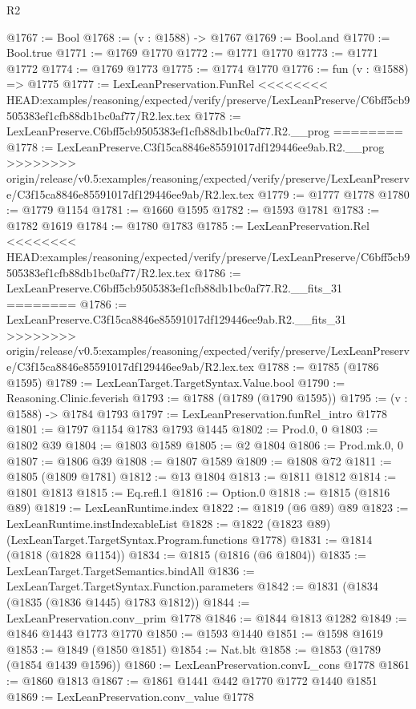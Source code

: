 \begin{lexlean}{R2}
\begin{coremodule}
{{{{{{{{{{{{{{{{{{{{{{{{{{{{{{{{{{{{{{{{{{{{{{{{{{{{{{{{{{{{{{{{{{{{{{{{{{{{{{{{{{{{{{{{{{{{@1767 := Bool
@1768 := (v : @1588) -> @1767
@1769 := Bool.and
@1770 := Bool.true
@1771 := @1769 @1770
@1772 := @1771 @1770
@1773 := @1771 @1772
@1774 := @1769 @1773
@1775 := @1774 @1770
@1776 := fun (v : @1588) => @1775
@1777 := LexLeanPreservation.FunRel
<<<<<<<< HEAD:examples/reasoning/expected/verify/preserve/LexLeanPreserve/C6bff5cb9505383ef1cfb88db1bc0af77/R2.lex.tex
@1778 := LexLeanPreserve.C6bff5cb9505383ef1cfb88db1bc0af77.R2.__prog
========
@1778 := LexLeanPreserve.C3f15ca8846e85591017df129446ee9ab.R2.__prog
>>>>>>>> origin/release/v0.5:examples/reasoning/expected/verify/preserve/LexLeanPreserve/C3f15ca8846e85591017df129446ee9ab/R2.lex.tex
@1779 := @1777 @1778
@1780 := @1779 @1154
@1781 := @1660 @1595
@1782 := @1593 @1781
@1783 := @1782 @1619
@1784 := @1780 @1783
@1785 := LexLeanPreservation.Rel
<<<<<<<< HEAD:examples/reasoning/expected/verify/preserve/LexLeanPreserve/C6bff5cb9505383ef1cfb88db1bc0af77/R2.lex.tex
@1786 := LexLeanPreserve.C6bff5cb9505383ef1cfb88db1bc0af77.R2.__fits_31
========
@1786 := LexLeanPreserve.C3f15ca8846e85591017df129446ee9ab.R2.__fits_31
>>>>>>>> origin/release/v0.5:examples/reasoning/expected/verify/preserve/LexLeanPreserve/C3f15ca8846e85591017df129446ee9ab/R2.lex.tex
@1788 := @1785 (@1786 @1595)
@1789 := LexLeanTarget.TargetSyntax.Value.bool
@1790 := Reasoning.Clinic.feverish
@1793 := @1788 (@1789 (@1790 @1595))
@1795 := (v : @1588) -> @1784 @1793
@1797 := LexLeanPreservation.funRel_intro @1778
@1801 := @1797 @1154 @1783 @1793 @1445
@1802 := Prod.{0, 0}
@1803 := @1802 @39
@1804 := @1803 @1589
@1805 := @2 @1804
@1806 := Prod.mk.{0, 0}
@1807 := @1806 @39
@1808 := @1807 @1589
@1809 := @1808 @72
@1811 := @1805 (@1809 @1781)
@1812 := @13 @1804
@1813 := @1811 @1812
@1814 := @1801 @1813
@1815 := Eq.refl.{1}
@1816 := Option.{0}
@1818 := @1815 (@1816 @89)
@1819 := LexLeanRuntime.index
@1822 := @1819 (@6 @89) @89
@1823 := LexLeanRuntime.instIndexableList
@1828 := @1822 (@1823 @89) (LexLeanTarget.TargetSyntax.Program.functions @1778)
@1831 := @1814 (@1818 (@1828 @1154))
@1834 := @1815 (@1816 (@6 @1804))
@1835 := LexLeanTarget.TargetSemantics.bindAll
@1836 := LexLeanTarget.TargetSyntax.Function.parameters
@1842 := @1831 (@1834 (@1835 (@1836 @1445) @1783 @1812))
@1844 := LexLeanPreservation.conv_prim @1778
@1846 := @1844 @1813 @1282
@1849 := @1846 @1443 @1773 @1770
@1850 := @1593 @1440
@1851 := @1598 @1619
@1853 := @1849 (@1850 @1851)
@1854 := Nat.blt
@1858 := @1853 (@1789 (@1854 @1439 @1596))
@1860 := LexLeanPreservation.convL_cons @1778
@1861 := @1860 @1813
@1867 := @1861 @1441 @442 @1770 @1772 @1440 @1851
@1869 := LexLeanPreservation.conv_value @1778
}}}}}}}}}}}}}}}}}}}}}}}}}}}}}}}}}}}}}}}}}}}}}}}}}}}}}}}}}}}}}}}}}}}}}}}}}}}}}}}}}}}}}}}}}}}}
\end{coremodule}
\end{lexlean}
